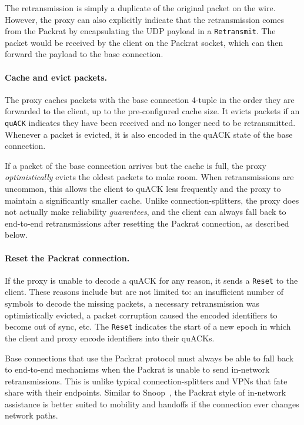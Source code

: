 The retransmission is simply a duplicate of the original packet on the wire.
However, the proxy can also explicitly indicate that the retransmission comes
from the Packrat by encapsulating the UDP payload in a \texttt{Retransmit}. The
packet would be received by the client on the Packrat socket, which can then forward
the payload to the base connection.

\paragraph{Cache and evict packets.}

The proxy caches packets with the base connection 4-tuple in the order they are
forwarded to the client, up to the pre-configured cache size. It evicts packets
if an \texttt{quACK} indicates they have been received and no longer need to be
retransmitted. Whenever a packet is evicted, it is also encoded in the quACK
state of the base connection.

If a packet of the base connection arrives but the cache is full, the
proxy \textit{optimistically} evicts the oldest packets to make room. When
retransmissions are uncommon, this allows the client to quACK less frequently
and the proxy to maintain a significantly smaller cache. Unlike
connection-splitters, the proxy does not actually make reliability \textit
{guarantees}, and the client can always fall back to end-to-end retransmissions
after resetting the Packrat connection, as described below.

\paragraph{Reset the Packrat connection.}

If the proxy is unable to decode a quACK for any reason, it sends a \texttt
{Reset} to the client. These reasons include but are not limited to: an
insufficient number of symbols to decode the missing packets, a necessary
retransmission was optimistically evicted,
a packet corruption caused the encoded identifiers
to become out of sync, etc. The \texttt{Reset} indicates the start of a new
epoch in which the client and proxy encode identifiers into their quACKs.

Base connections that use the Packrat protocol must always be able to fall back to
end-to-end mechanisms when the Packrat is unable to send in-network
retransmissions. This is unlike typical connection-splitters and VPNs that fate
share with their endpoints. Similar to Snoop~\cite{balakrishnan1995snoop},
the Packrat style of in-network
assistance is better suited to mobility and handoffs if the connection ever
changes network paths.


